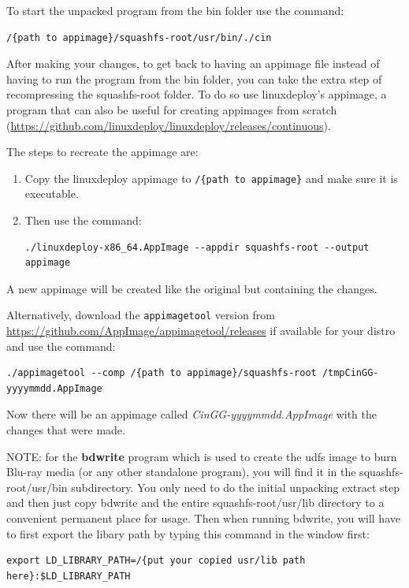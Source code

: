 To start the unpacked program from the bin folder use the command:

\begin{lstlisting}[numbers=none]
	/{path to appimage}/squashfs-root/usr/bin/./cin
\end{lstlisting}

After making your changes, to get back to having an appimage file instead of having to run the program from the bin folder, you can take the extra step of recompressing the squashfs-root folder.
To do so use linuxdeploy's appimage, a program that can also be useful for creating appimages from scratch (\url{https://github.com/linuxdeploy/linuxdeploy/releases/continuous}).

The steps to recreate the appimage are:

\begin{enumerate}
	\item Copy the linuxdeploy appimage to \texttt{/\{path to appimage\}} and make sure it is executable.
	\item Then use the command:
	\begin{lstlisting}[numbers=none]
		./linuxdeploy-x86_64.AppImage --appdir squashfs-root --output appimage
	\end{lstlisting}
\end{enumerate}

A new appimage will be created like the original but containing the changes.

Alternatively, download the \texttt{appimagetool} version from \url{https://github.com/AppImage/appimagetool/releases} if available for your distro and use the command:

\begin{lstlisting}[numbers=none]
	./appimagetool --comp /{path to appimage}/squashfs-root /tmpCinGG-yyyymmdd.AppImage
\end{lstlisting}

Now there will be an appimage called \textit{CinGG-yyyymmdd.AppImage} with the changes that were made.

NOTE: for the \textbf{bdwrite} program which is used to create the udfs image to burn Blu-ray
media (or any other standalone program), you will find it in the squashfs-root/usr/bin
subdirectory. You only need to do the initial unpacking extract step and then just copy
bdwrite and the entire squashfs-root/usr/lib directory to a convenient permanent place for
usage.  Then when running bdwrite, you will have to first export the libary path by typing
this command in the window first:
\begin{lstlisting}[numbers=none]
export LD_LIBRARY_PATH=/{put your copied usr/lib path here}:$LD_LIBRARY_PATH
\end{lstlisting}


